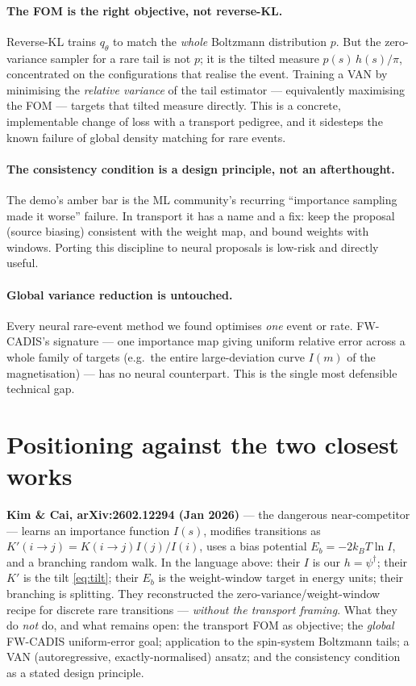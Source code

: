 \documentclass[11pt]{article}
\newcommand{\dg}{^{\dagger}}
\begin{document}
\paragraph{The FOM is the right objective, not reverse-KL.} Reverse-KL trains $q_\theta$ to
match the \emph{whole} Boltzmann distribution $p$. But the zero-variance sampler for a rare
tail is not $p$; it is the tilted measure $p(s)\,h(s)/\pi$, concentrated on the
configurations that realise the event. Training a VAN by minimising the \emph{relative
variance} of the tail estimator --- equivalently maximising the FOM --- targets that tilted
measure directly. This is a concrete, implementable change of loss with a transport
pedigree, and it sidesteps the known failure of global density matching for rare events.

\paragraph{The consistency condition is a design principle, not an afterthought.} The demo's
amber bar is the ML community's recurring ``importance sampling made it worse'' failure. In
transport it has a name and a fix: keep the proposal (source biasing) consistent with the
weight map, and bound weights with windows. Porting this discipline to neural proposals is
low-risk and directly useful.

\paragraph{Global variance reduction is untouched.} Every neural rare-event method we found
optimises \emph{one} event or rate. FW-CADIS's signature --- one importance map giving
uniform relative error across a whole family of targets (e.g.\ the entire large-deviation
curve $I(m)$ of the magnetisation) --- has no neural counterpart. This is the single most
defensible technical gap.

\section{Positioning against the two closest works}
\label{sec:pos}
\textbf{Kim \& Cai, arXiv:2602.12294 (Jan 2026)} --- the dangerous near-competitor --- learns
an importance function $I(s)$, modifies transitions as $K'(i\to j)=K(i\to j)I(j)/I(i)$, uses
a bias potential $E_b=-2k_BT\ln I$, and a branching random walk. In the language above:
their $I$ is our $h=\psi\dg$; their $K'$ is the tilt \eqref{eq:tilt}; their $E_b$ is the
weight-window target in energy units; their branching is splitting. They reconstructed the
zero-variance/weight-window recipe for discrete rare transitions --- \emph{without the
transport framing}. What they do \emph{not} do, and what remains open: the transport FOM as
objective; the \emph{global} FW-CADIS uniform-error goal; application to the spin-system
Boltzmann tails; a VAN (autoregressive, exactly-normalised) ansatz; and the consistency
condition as a stated design principle.
\end{document}
